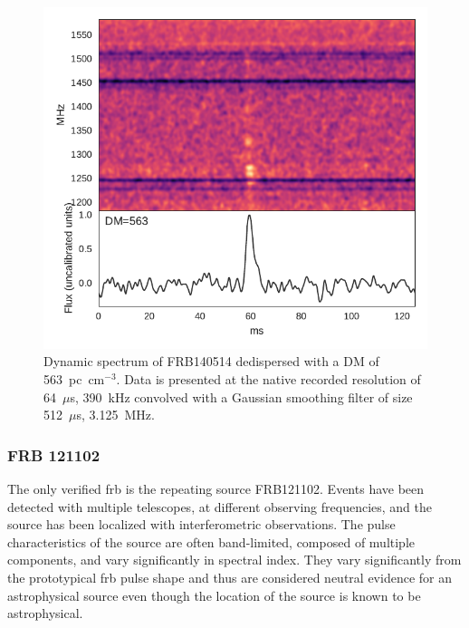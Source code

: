 \documentclass[a4paper,fleqn,usenatbib]{mnras}
\begin{document}

\begin{figure}
    \includegraphics[width=1.0\linewidth]{figures/FRB140514.pdf}
    \caption{Dynamic spectrum of FRB140514 dedispersed with a DM of
    563~pc~cm$^{-3}$.  Data is presented at the native recorded resolution of
    64~$\mu$s, 390~kHz convolved with a Gaussian smoothing filter of size
    512~$\mu$s, 3.125~MHz.
    }
    \label{fig:FRB140514}
\end{figure}

\subsubsection{FRB 121102}

The only verified \gls{frb} is the repeating source FRB121102. Events have been
detected with multiple telescopes, at different observing frequencies, and the
source has been localized with interferometric observations. The pulse
characteristics of the source are often band-limited, composed of multiple
components, and vary significantly in spectral index. They vary significantly
from the prototypical \gls{frb} pulse shape and thus are considered neutral
evidence for an astrophysical source even though the location of the source is
known to be astrophysical. %
\end{document}
